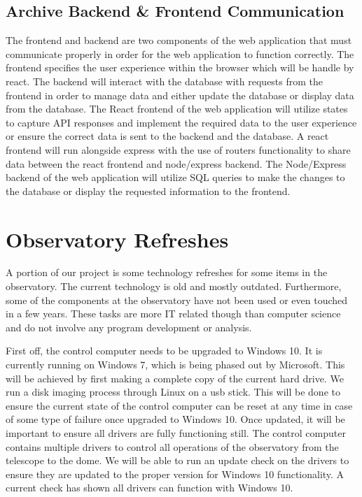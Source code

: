 \documentclass[12pt]{report}
\begin{document}
\subsection*{Archive Backend \& Frontend Communication}

The frontend and backend are two components of the web application that must communicate properly in order for the web application to function correctly.  The frontend specifies the user experience within the browser which will be handle by react.  The backend will interact with the database with requests from the frontend in order to manage data and either update the database or display data from the database.
The React frontend of the web application will utilize states to capture API responses and implement the required data to the user experience or ensure the correct data is sent to the backend and the database.  A react frontend will run alongside express with the use of routers functionality to share data between the react frontend and node/express backend.
The Node/Express backend of the web application will utilize SQL queries to make the changes to the database or display the requested information to the frontend.

\section*{Observatory Refreshes}

A portion of our project is some technology refreshes for some items in the observatory. The current technology is old and mostly outdated. Furthermore, some of the components at the observatory have not been used or even touched in a few years. These tasks are more IT related though than computer science and do not involve any program development or analysis.

First off, the control computer needs to be upgraded to Windows 10. It is currently running on Windows 7, which is being phased out by Microsoft. This will be achieved by first making a complete copy of the current hard drive. We run a disk imaging process through Linux on a usb stick. This will be done to ensure the current state of the control computer can be reset at any time in case of some type of failure once upgraded to Windows 10. Once updated, it will be important to ensure all drivers are fully functioning still. The control computer contains multiple drivers to control all operations of the observatory from the telescope to the dome. We will be able to run an update check on the drivers to ensure they are updated to the proper version for Windows 10 functionality. A current check has shown all drivers can function with Windows 10.
\end{document}
